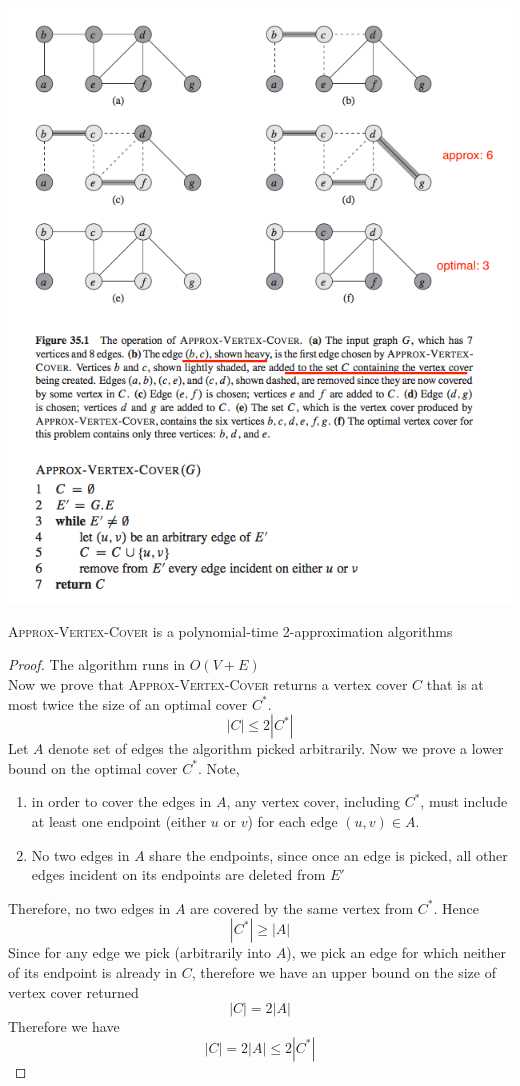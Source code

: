 \documentclass[11pt]{article}
\begin{document}
\includegraphics[width=\textwidth]{vertex_cover.png}



\begin{theorem*}
    \textsc{Approx-Vertex-Cover} is a polynomial-time 2-approximation algorithms
    \begin{proof}
        The algorithm runs in $O(V+E)$ \\
        Now we prove that \textsc{Approx-Vertex-Cover} returns a vertex cover $C$ that is at most twice the size of an optimal cover $C^*$. 
        \[
            |C| \leq 2 |C^*|
        \]
        Let $A$ denote set of edges the algorithm picked arbitrarily. Now we prove a lower bound on the optimal cover $C^*$. Note,
        \begin{enumerate}
            \item in order to cover the edges in $A$, any vertex cover, including $C^*$, must include at least one endpoint (either $u$ or $v$) for each edge $(u,v) \in A$. 
            \item No two edges in $A$ share the endpoints, since once an edge is picked, all other edges incident on its endpoints are deleted from $E'$ 
        \end{enumerate}
        Therefore, no two edges in $A$ are covered by the same vertex from $C^*$. Hence 
        \[
            |C^*| \geq |A|
        \]
        Since for any edge we pick (arbitrarily into $A$), we pick an edge for which neither of its endpoint is already in $C$, therefore we have an upper bound on the size of vertex cover returned
        \[
            |C| = 2|A|
        \]
        Therefore we have 
        \[
            |C| = 2|A| \leq 2|C^*|
        \]
    \end{proof}
\end{theorem*}
\end{document}
